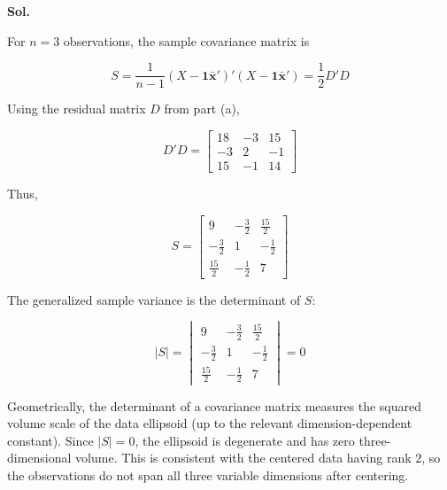 \documentclass[12pt]{article}
\begin{document}
\vspace{0.2cm}

\textbf{Sol.}

\vspace{0.2cm}

For \(n=3\) observations, the sample covariance matrix is

\vspace{0.2cm}

\[
S=\frac{1}{n-1}
(X-\boldsymbol{1}\bar{\boldsymbol{x}}')
'(X-\boldsymbol{1}\bar{\boldsymbol{x}}')
=\frac12D'D
\]

\vspace{0.2cm}

Using the residual matrix \(D\) from part (a),

\vspace{0.2cm}

\[
D'D=
\begin{bmatrix}
18&-3&15\\
-3&2&-1\\
15&-1&14
\end{bmatrix}
\]

\vspace{0.2cm}

Thus,

\vspace{0.2cm}

\[
\boxed{
S=\begin{bmatrix}
9&-\frac32&\frac{15}{2}\\
-\frac32&1&-\frac12\\
\frac{15}{2}&-\frac12&7
\end{bmatrix}
}
\]

\vspace{0.2cm}

The generalized sample variance is the determinant of \(S\):

\vspace{0.2cm}

\[
|S|=
\begin{vmatrix}
9&-\frac32&\frac{15}{2}\\
-\frac32&1&-\frac12\\
\frac{15}{2}&-\frac12&7
\end{vmatrix}
=\boxed{0}
\]

\vspace{0.2cm}

Geometrically, the determinant of a covariance matrix measures the squared volume scale of the data ellipsoid (up to the relevant dimension-dependent constant). Since \(|S|=0\), the ellipsoid is degenerate and has zero three-dimensional volume. This is consistent with the centered data having rank \(2\), so the observations do not span all three variable dimensions after centering.
\end{document}
